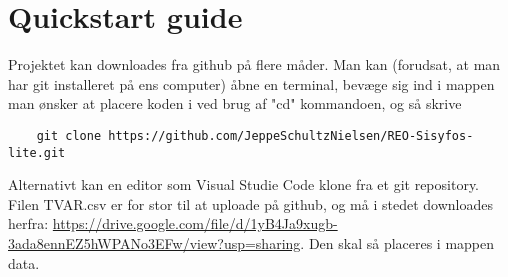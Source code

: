 \documentclass{article}
\begin{document}
\section{Quickstart guide}
Projektet kan downloades fra github på flere måder. Man kan (forudsat, at man har git installeret på ens computer) åbne en terminal, bevæge sig ind i mappen man ønsker at placere koden i ved brug af "cd" kommandoen, og så skrive
\begin{verbatim}
    git clone https://github.com/JeppeSchultzNielsen/REO-Sisyfos-lite.git
\end{verbatim}
Alternativt kan en editor som Visual Studie Code klone fra et git repository. Filen TVAR.csv er for stor til at uploade på github, og må i stedet downloades herfra: \url{https://drive.google.com/file/d/1yB4Ja9xugb-3ada8ennEZ5hWPANo3EFw/view?usp=sharing}. Den skal så placeres i mappen data. 
\end{document}
